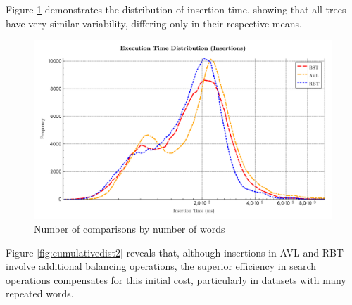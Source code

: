  Figure \ref{fig:timedist2} demonstrates the distribution of insertion time, showing that all trees 
 have very similar variability, differing only in their respective means.

 \begin{figure}[H]
     \centering
     \includegraphics[width=0.8\linewidth]{img/Graph_5_199865.pdf}
     \caption{Number of comparisons by number of words}
     \label{fig:timedist2}
 \end{figure}

 Figure \ref{fig:cumulativedist2} reveals that, although insertions in AVL and RBT
 involve additional balancing operations, the superior efficiency in search operations
 compensates for this initial cost, particularly in datasets with many repeated words.

